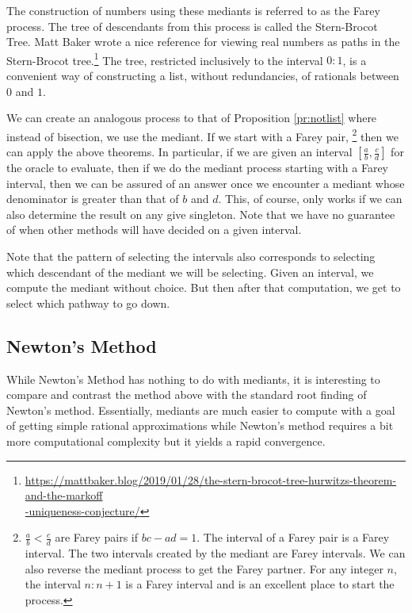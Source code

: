 \documentclass[12pt]{article}
\theoremstyle{remark}
\begin{document}
The construction of numbers using these mediants is referred to as the Farey process. The tree of descendants from this process is called the Stern-Brocot Tree. Matt Baker wrote a nice reference for viewing real numbers as paths in the Stern-Brocot tree.\footnote{{\href{https://mattbaker.blog/2019/01/28/the-stern-brocot-tree-hurwitzs-theorem-and-the-markoff-uniqueness-conjecture/}{https://mattbaker.blog/2019/01/28/the-stern-brocot-tree-hurwitzs-theorem-and-the-markoff} \\ \hspace*{10px}  \href{https://mattbaker.blog/2019/01/28/the-stern-brocot-tree-hurwitzs-theorem-and-the-markoff-uniqueness-conjecture/}{-uniqueness-conjecture/} }} The tree, restricted inclusively to the interval $0:1$, is a convenient way of constructing a list, without redundancies, of rationals between $0$ and $1$. 

We can create an analogous process to that of Proposition \ref{pr:notlist} where instead of bisection, we use the mediant. If we start with a Farey pair, \footnote{$\frac{a}{b} < \frac{c}{d}$ are Farey pairs if $bc-ad=1$. The interval of a Farey pair is a Farey interval. The two intervals created by the mediant are Farey intervals. We can also reverse the mediant process to get the Farey partner. For any integer $n$, the interval $n:n+1$ is a Farey interval and is an excellent place to start the process.} then we can apply the above theorems. In particular, if we are given an interval $[\frac{a}{b}, \frac{c}{d}]$ for the oracle to evaluate, then if we do the mediant process starting with a Farey interval, then we can be assured of an answer once we encounter a mediant whose denominator is greater than that of $b$ and $d$. This, of course, only works if we can also determine the result on any give singleton. Note that we have no guarantee of when other methods will have decided on a given interval. 

Note that the pattern of selecting the intervals also corresponds to selecting which descendant of the mediant we will be selecting. Given an interval, we compute the mediant without choice. But then after that computation, we get to select which pathway to go down. 


\subsection{Newton's Method}

While Newton's Method has nothing to do with mediants, it is interesting to compare and contrast the method above with the standard root finding of Newton's method. Essentially, mediants are much easier to compute with a goal of getting simple rational approximations while Newton's method requires a bit more computational complexity but it yields a rapid convergence. 
\end{document}
